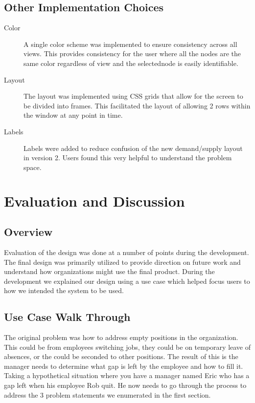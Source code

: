 \documentclass[journal]{vgtc}                %
\begin{document}
\subsection{Other Implementation Choices}
\begin{description}
  
\item[Color] A single color scheme was implemented to ensure consistency across all views.  This provides consistency for the user where all the nodes are the same color regardless of view and the selectednode is easily identifiable.
  
\item[Layout] The layout was implemented using CSS grids that allow for the screen to be divided into frames.  This facilitated the layout of allowing 2 rows within the window at any point in time.
  
\item [Labels]Labels were added to reduce confusion of the new demand/supply layout in version 2.  Users found this very helpful to understand the problem space.
\end{description}


\section{Evaluation and Discussion}
\label{sec:evaldiscuss}

\subsection{Overview}
Evaluation of the design was done at a number of points during the development.  The final design was primarily utilized to provide direction on future work and understand how organizations might use the final product.  During the development we explained our design using a use case which helped focus users to how we intended the system to be used.

\subsection{Use Case Walk Through}
The original problem was how to address empty positions in the organization.  This could be from employees switching jobs, they could be on temporary leave of absences, or the could be seconded to other positions.  The result of this is the manager needs to determine what gap is left by the employee and how to fill it.  Taking a hypothetical situation where you have a manager named Eric who has a gap left when his employee Rob quit.  He now needs to go through the process to address the 3 problem statements we enumerated in the first section.
\end{document}
